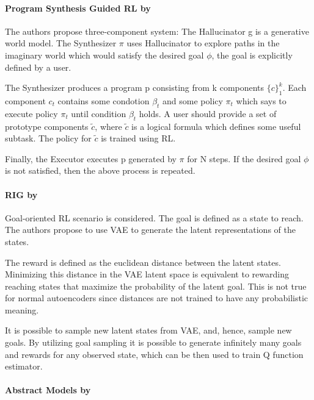 \documentclass[acmsmall, nonacm]{acmart}
\begin{document}

\paragraph{Program Synthesis Guided RL by \citet{Yang2021ProgramSG}}

The authors propose three-component system: The Hallucinator g is a generative world model. The Synthesizer $\pi$ uses Hallucinator to explore paths in the imaginary world which would satisfy the desired goal $\phi$, the goal is explicitly defined by a user.

The Synthesizer produces a program p consisting from k components $\{c\}_1^k$. Each component $c_t$ contains some condotion $\beta_t$ and some policy $\pi_t$ which says to execute policy $\pi_t$ until condition $\beta_t$ holds. A user should provide a set of prototype components $\tilde{c}$, where $\tilde{c}$ is a logical formula which defines some useful subtask. The policy for $\tilde{c}$ is trained using RL.

Finally, the Executor executes p generated by $\pi$ for N steps. If the desired goal $\phi$ is not satisfied, then the above process is repeated.


\paragraph{RIG by \citet{Nair2018VisualRL}}

Goal-oriented RL scenario is considered. The goal is defined as a state to reach. The authors propose to use VAE to generate the latent representations of the states.

The reward is defined as the euclidean distance between the latent states. Minimizing this distance in the VAE latent space is equivalent to rewarding reaching states that maximize the probability of the latent goal. This is not true for normal autoencoders since distances are not trained to have any probabilistic meaning.

It is possible to sample new latent states from VAE, and, hence, sample new goals. By utilizing goal sampling it is possible to generate infinitely many goals and rewards for any observed state, which can be then used to train Q function estimator.


\paragraph{Abstract Models by \citet{liu2019learning}}
\end{document}

